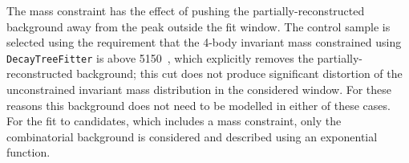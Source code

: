 The \jpsi mass constraint has the effect of pushing the partially-reconstructed   background away from 
the peak outside the fit window. The \jpsi control sample is selected using the requirement that the 4-body 
invariant mass constrained using \verb!DecayTreeFitter! is above 5150~\mevc, which explicitly removes
the partially-reconstructed   background; this cut does not produce significant distortion of the
unconstrained invariant mass distribution in the considered window. 
For these reasons this background does not need to be modelled in either of these cases.
%
%
%
%
%
%
%
%
%
%
For the fit to \BdToKstPsiee candidates, which includes a \psitwos mass constraint, only the combinatorial background is considered
and described using an exponential function.
%

